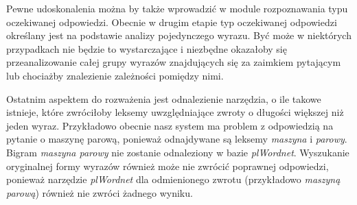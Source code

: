 Pewne udoskonalenia można by także wprowadzić w module rozpoznawania typu oczekiwanej odpowiedzi. Obecnie w drugim etapie typ oczekiwanej odpowiedzi określany jest na podstawie analizy pojedynczego wyrazu. Być może w niektórych przypadkach nie będzie to wystarczające i niezbędne okazałoby się przeanalizowanie całej grupy wyrazów znajdujących się za zaimkiem pytającym lub chociażby znalezienie zależności pomiędzy nimi. 

Ostatnim aspektem do rozważenia jest odnalezienie narzędzia, o ile takowe istnieje, które zwróciłoby leksemy uwzględniające zwroty o długości większej niż jeden wyraz. Przykładowo obecnie nasz system ma problem z odpowiedzią na pytanie o maszynę parową, ponieważ odnajdywane są leksemy \emph{maszyna} i \emph{parowy}. Bigram \emph{maszyna parowy} nie zostanie odnaleziony w bazie \emph{plWordnet}. Wyszukanie oryginalnej formy wyrazów również może nie zwrócić poprawnej odpowiedzi, ponieważ narzędzie \emph{plWordnet} dla odmienionego zwrotu (przykładowo \emph{maszyną parową}) również nie zwróci żadnego wyniku.


